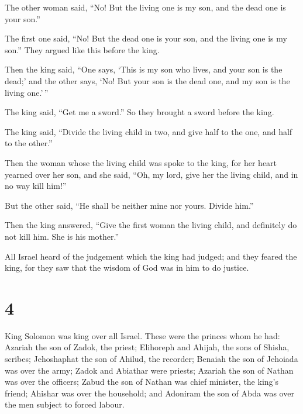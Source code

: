  The other woman said, ``No! But the living one is my
son, and the dead one is your son.''

The first one said, ``No! But the dead one is your son, and the living
one is my son.'' They argued like this before the king.

 Then the king said, ``One says, `This is my son who
lives, and your son is the dead;' and the other says, `No! But your son
is the dead one, and my son is the living one.'\,''

 The king said, ``Get me a sword.'' So they brought a
sword before the king.

 The king said, ``Divide the living child in two, and
give half to the one, and half to the other.''

 Then the woman whose the living child was spoke to the
king, for her heart yearned over her son, and she said, ``Oh, my lord,
give her the living child, and in no way kill him!''

But the other said, ``He shall be neither mine nor yours. Divide him.''

 Then the king answered, ``Give the first woman the
living child, and definitely do not kill him. She is his mother.''

 All Israel heard of the judgement which the king had
judged; and they feared the king, for they saw that the wisdom of God
was in him to do justice.

\hypertarget{section-3}{%
\section{4}\label{section-3}}

 King Solomon was king over all Israel. 
These were the princes whom he had: Azariah the son of Zadok, the
priest;  Elihoreph and Ahijah, the sons of Shisha,
scribes; Jehoshaphat the son of Ahilud, the recorder; 
Benaiah the son of Jehoiada was over the army; Zadok and Abiathar were
priests;  Azariah the son of Nathan was over the officers;
Zabud the son of Nathan was chief minister, the king's friend;
 Ahishar was over the household; and Adoniram the son of
Abda was over the men subject to forced labour.

